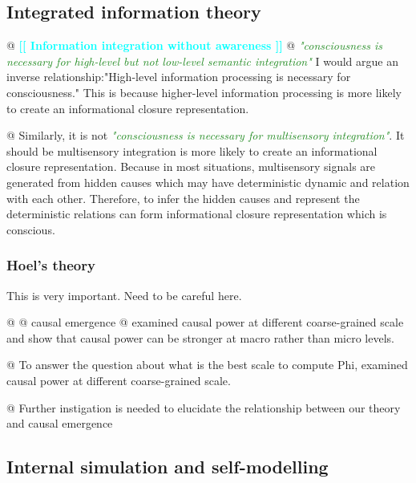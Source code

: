 \documentclass[utf8]{article}
\newenvironment{ants}
			{
			 \begin{easylist}[itemize]
			}
			{
			\end{easylist}
			}
\newcommand{\rewrite}[1]{\textcolor{ForestGreen}{\textit{"#1"}}\newline}
\newcommand{\ideaBox}[1]{
				\begin{tcolorbox}[hyphenationfix, width=12cm, colback=Thistle!50!white, flush right]
					#1
				\end{tcolorbox}
			}
\newcommand{\toWrite}[1]{\noindent
			\textcolor{Cyan}{\textbf{[[ #1 ]]}}}
\newcommand{\callforhelp}[1]{\todo[color=SpringGreen]{#1}}
\begin{document}
		\subsection{Integrated information theory\callforhelp{Help from Jun?}}
			\begin{ants}
				@ \toWrite{Information integration without awareness}\cite{Mudrik_Faivre_Koch}
				@ \rewrite{consciousness is necessary for high-level but not low-level semantic integration}\cite{Mudrik_Faivre_Koch} I would argue an inverse relationship:"High-level information processing is necessary for consciousness." This is because higher-level information processing is more likely to create an informational closure representation. 
				
				@ Similarly, it is not \rewrite{consciousness is necessary for multisensory integration}. It should be multisensory integration is more likely to create an informational closure representation. Because in most situations, multisensory signals are generated from hidden causes which may have deterministic dynamic and relation with each other. Therefore, to infer the hidden causes and represent the deterministic relations can form informational closure representation which is conscious.  
				
			\end{ants}
						
			
			\subsubsection{Hoel's theory\callforhelp{Help from Marting?}}
				\ideaBox{This is very important. Need to be careful here.}
				
				
				\begin{ants}
					@ \cite{hoel2016can}
					@ causal emergence
					@ \cite{hoel2013quantifying} examined causal power at different coarse-grained scale and show that causal power can be stronger at macro rather than micro levels. 
					
					
					@ To answer the question about what is the best scale to compute Phi, \cite{hoel2016can} examined causal power at different coarse-grained scale. 
					
					@ Further instigation is needed to elucidate the relationship between our theory and causal emergence
					
					
				\end{ants}
				
				
		\subsection{Internal simulation and self-modelling}
		
\end{document}
